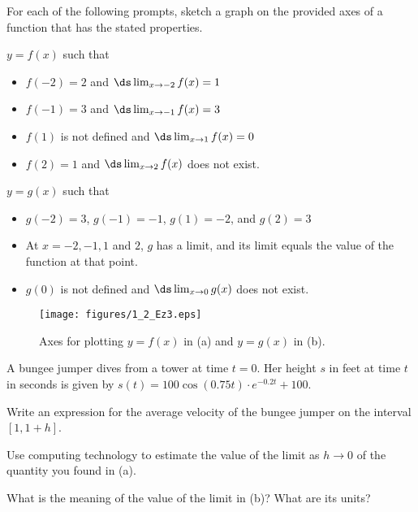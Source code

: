 \begin{exercises}
\item For each of the following prompts, sketch a graph on the provided axes of a function that has the stated properties.
  \ba
  	\item $y = f(x)$ such that 
	\begin{itemize}
		\item $f(-2) = 2$ and $\ds \lim_{x \to -2} f(x) = 1$
		\item $f(-1) = 3$ and $\ds \lim_{x \to -1} f(x) = 3$
		\item $f(1)$ is not defined and $\ds \lim_{x \to 1} f(x) = 0$
		\item $f(2) = 1$ and $\ds \lim_{x \to 2} f(x)$ does not exist.
	\end{itemize}
	\item $y = g(x)$ such that
	\begin{itemize}
		\item $g(-2) = 3$, $g(-1) = -1$, $g(1) = -2$, and $g(2) = 3$
		\item At $x = -2, -1, 1$ and $2$, $g$ has a limit, and its limit equals the value of the function at that point.
		\item $g(0)$ is not defined and $\ds \lim_{x \to 0} g(x)$ does not exist.
	\end{itemize}
\begin{figure}[h]
  \begin{center}
 \texttt{[image: figures/1\_2\_Ez3.eps]} %
   \end{center}
   \caption{Axes for plotting $y = f(x)$ in (a) and $y = g(x)$ in (b).} \label{F:1.2.Ez3}
\end{figure}
  \ea

\item A bungee jumper dives from a tower at time $t=0$. Her height  $s$ in feet at time $t$ in seconds is given by $s(t) = 100\cos(0.75t) \cdot e^{-0.2t}+100$.
	\ba
		\item Write an expression for the average velocity of the bungee jumper on the interval \\ $[1,1+h]$.
		\item Use computing technology to estimate the value of the limit as $h \to 0$ of the quantity you found in (a).
		\item What is the meaning of the value of the limit in (b)?  What are its units?
	\ea

\end{exercises}
\afterexercises
